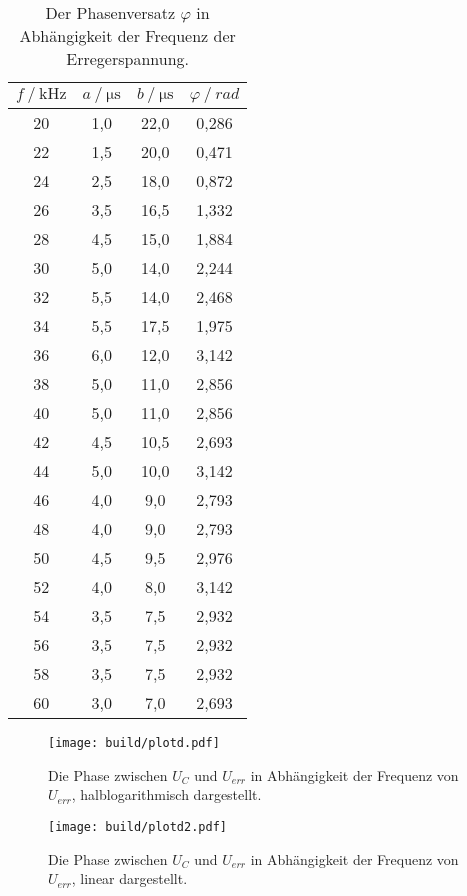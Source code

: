 \begin{table}[H]
  \centering
  \caption{Der Phasenversatz $\varphi$ in Abhängigkeit der Frequenz der Erregerspannung.}
  \begin{tabular}{cccc}
    \toprule
    {$f \mathbin{/} \unit{\kilo\hertz}$} &
    {$a \mathbin{/} \unit{\micro\second}$} &
    {$b \mathbin{/} \unit{\micro\second}$} &
    {$\varphi \mathbin{/} rad$} \\
    \midrule
    
    20 & 1,0 & 22,0 & 0,286 \\
    22 & 1,5 & 20,0 & 0,471 \\
    24 & 2,5 & 18,0 & 0,872 \\
    26 & 3,5 & 16,5 & 1,332 \\
    28 & 4,5 & 15,0 & 1,884 \\
    30 & 5,0 & 14,0 & 2,244 \\
    32 & 5,5 & 14,0 & 2,468 \\
    34 & 5,5 & 17,5 & 1,975 \\
    36 & 6,0 & 12,0 & 3,142 \\
    38 & 5,0 & 11,0 & 2,856 \\
    40 & 5,0 & 11,0 & 2,856 \\
    42 & 4,5 & 10,5 & 2,693 \\
    44 & 5,0 & 10,0 & 3,142 \\
    46 & 4,0 &  9,0 & 2,793 \\
    48 & 4,0 &  9,0 & 2,793 \\
    50 & 4,5 &  9,5 & 2,976 \\
    52 & 4,0 &  8,0 & 3,142 \\
    54 & 3,5 &  7,5 & 2,932 \\
    56 & 3,5 &  7,5 & 2,932 \\
    58 & 3,5 &  7,5 & 2,932 \\
    60 & 3,0 &  7,0 & 2,693 \\
    
    \bottomrule
  \end{tabular}
  \label{tab:Tabelle2}
\end{table}



\begin{figure}
      \centering
      \texttt{[image: build/plotd.pdf]}
      \caption{Die Phase zwischen $U_C$ und $U_{err}$ in Abhängigkeit der Frequenz von $U_{err}$, halblogarithmisch dargestellt.}
      \label{fig:plotd}
    \end{figure}



    \begin{figure}
      \centering
      \texttt{[image: build/plotd2.pdf]}
      \caption{Die Phase zwischen $U_C$ und $U_{err}$ in Abhängigkeit der Frequenz von $U_{err}$, linear dargestellt.}
      \label{fig:plotd2}
    \end{figure}



    